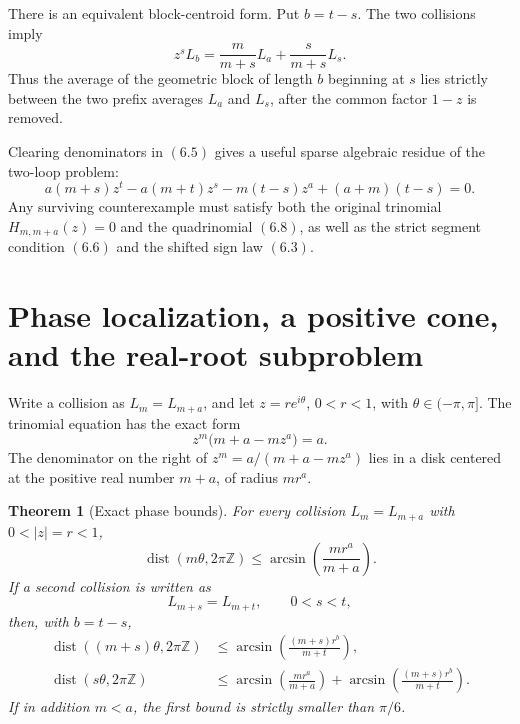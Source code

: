 \documentclass[11pt]{article}
\newtheorem{theorem}{Theorem}[section]
\theoremstyle{definition}
\newcommand{\Z}{\mathbb Z}
\begin{document}
There is an equivalent block-centroid form.  Put \(b=t-s\).  The two
collisions imply
\begin{equation}
 z^sL_b
 =\frac{m}{m+s}L_a+\frac{s}{m+s}L_s.
 \tag{6.7}
\end{equation}
Thus the average of the geometric block of length \(b\) beginning at \(s\)
lies strictly between the two prefix averages \(L_a\) and \(L_s\), after the
common factor \(1-z\) is removed.

Clearing denominators in \((6.5)\) gives a useful sparse algebraic residue of
the two-loop problem:
\begin{equation}
 a(m+s)z^t-a(m+t)z^s-m(t-s)z^a+(a+m)(t-s)=0.
 \tag{6.8}
\end{equation}
Any surviving counterexample must satisfy both the original trinomial
\(H_{m,m+a}(z)=0\) and the quadrinomial \((6.8)\), as well as the strict
segment condition \((6.6)\) and the shifted sign law \((6.3)\).

\section{Phase localization, a positive cone, and the real-root subproblem}
\label{sec:phase}

Write a collision as \(L_m=L_{m+a}\), and let
\(z=re^{i\theta}\), \(0<r<1\), with \(\theta\in(-\pi,\pi]\).
The trinomial equation has the exact form
\begin{equation}
 z^m\bigl(m+a-mz^a\bigr)=a.
 \tag{7.1}
\end{equation}
The denominator on the right of
\(z^m=a/(m+a-mz^a)\) lies in a disk centered at the positive real number
\(m+a\), of radius \(mr^a\).

\begin{theorem}[Exact phase bounds]\label{thm:phase}
For every collision \(L_m=L_{m+a}\) with \(0<|z|=r<1\),
\begin{equation}
 \operatorname{dist}(m\theta,2\pi\Z)
 \leq
 \arcsin\!\left(\frac{mr^a}{m+a}\right).
 \tag{7.2}
\end{equation}
If a second collision is written as
\[
 L_{m+s}=L_{m+t},\qquad 0<s<t,
\]
then, with \(b=t-s\),
\begin{align}
 \operatorname{dist}((m+s)\theta,2\pi\Z)
 &\leq
 \arcsin\!\left(\frac{(m+s)r^b}{m+t}\right),
 \tag{7.3}\\
 \operatorname{dist}(s\theta,2\pi\Z)
 &\leq
 \arcsin\!\left(\frac{mr^a}{m+a}\right)
 +\arcsin\!\left(\frac{(m+s)r^b}{m+t}\right).
 \tag{7.4}
\end{align}
If in addition \(m<a\), the first bound is strictly smaller than \(\pi/6\).
\end{theorem}
\end{document}
